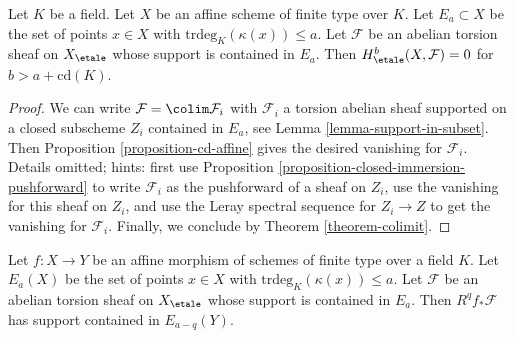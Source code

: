 \begin{lemma}
\label{lemma-interlude-II}
Let $K$ be a field. Let $X$ be an affine scheme of finite type over $K$.
Let $E_a \subset X$ be the set of points
$x \in X$ with $\text{trdeg}_K(\kappa(x)) \leq a$.
Let $\mathcal{F}$ be an abelian torsion sheaf on $X_\etale$
whose support is contained in $E_a$. Then
$H^b_\etale(X, \mathcal{F}) = 0$ for $b > a + \text{cd}(K)$.
\end{lemma}

\begin{proof}
We can write $\mathcal{F} = \colim \mathcal{F}_i$
with $\mathcal{F}_i$ a torsion abelian sheaf
supported on a closed subscheme $Z_i$ contained in $E_a$, see
Lemma \ref{lemma-support-in-subset}.
Then Proposition \ref{proposition-cd-affine} gives
the desired vanishing for $\mathcal{F}_i$. Details omitted;
hints: first use Proposition \ref{proposition-closed-immersion-pushforward}
to write $\mathcal{F}_i$ as the pushforward of a sheaf on $Z_i$,
use the vanishing for this sheaf on $Z_i$, and use
the Leray spectral sequence for $Z_i \to Z$ to get the vanishing
for $\mathcal{F}_i$. Finally, we
conclude by Theorem \ref{theorem-colimit}.
\end{proof}

\begin{lemma}
\label{lemma-interlude-I}
Let $f : X \to Y$ be an affine morphism of schemes of finite
type over a field $K$. Let $E_a(X)$ be the set of points $x \in X$
with $\text{trdeg}_K(\kappa(x)) \leq a$.
Let $\mathcal{F}$ be an abelian torsion sheaf on $X_\etale$
whose support is contained in $E_a$. Then
$R^qf_*\mathcal{F}$ has support contained in
$E_{a - q}(Y)$.
\end{lemma}

